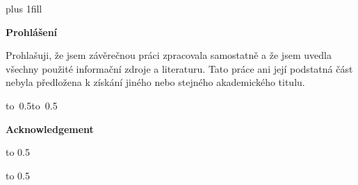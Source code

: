 \newpage



\openright
\hypersetup{pageanchor=true}
\pagestyle{plain}
\vglue 0pt plus 1fill

\noindent\medskip
{\large\bfseries Prohlášení}

\noindent
Prohlašuji, že jsem závěrečnou práci zpracovala samostatně a že jsem uvedla všechny použité informační zdroje a literaturu. Tato práce ani její podstatná část nebyla předložena k získání jiného nebo stejného akademického titulu.

\vspace{10mm}

\hbox{\hbox to 0.5\hbox to 0.5}

\vspace{20mm}
\newpage

\openright

\noindent

{\large\bfseries Acknowledgement}
\DedicationAJ

\newpage


\openright

\vbox to 0.5


\newpage


\openright

\vbox to 0.5


\newpage

\openright
\pagestyle{plain}
\setcounter{page}{1}

